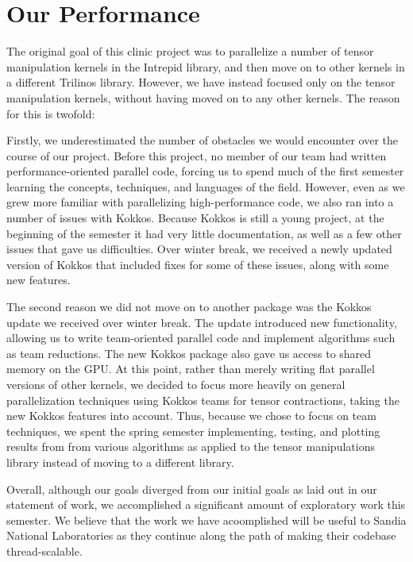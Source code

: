 
\chapter{Our Performance}

The original goal of this clinic project was to parallelize a number of tensor
manipulation kernels in the Intrepid library, and then move on to other kernels
in a different Trilinos library.  However, we have instead focused only on the
tensor manipulation kernels, without having moved on to any other kernels. The
reason for this is twofold:

Firstly, we underestimated the number of obstacles we would encounter over the
course of our project.  Before this project, no member of our team had written
performance-oriented parallel code, forcing us to spend much of the first
semester learning the concepts, techniques, and languages of the field.
However, even as we grew more familiar with parallelizing high-performance code,
we also ran into a number of issues with Kokkos.  Because Kokkos is still a
young project, at the beginning of the semester it had very little
documentation, as well as a few other issues that gave us difficulties.  Over
winter break, we received a newly updated version of Kokkos that included fixes
for some of these issues, along with some new features.

The second reason we did not move on to another package was the Kokkos update we
received over winter break.  The update introduced new functionality, allowing
us to write team-oriented parallel code and implement algorithms such as team
reductions.  The new Kokkos package also gave us access to shared memory on the
GPU. At this point, rather than merely writing flat parallel versions of other
kernels, we decided to focus more heavily on general parallelization techniques
using Kokkos teams for tensor contractions, taking the new Kokkos features into
account.  Thus, because we chose to focus on team techniques, we spent the
spring semester implementing, testing, and plotting results from from various
algorithms as applied to the tensor manipulations library instead of moving to a
different library.

Overall, although our goals diverged from our initial goals as laid out in our 
statement of work, we accomplished a significant amount of exploratory work this
semester. We believe that the work we have acoomplished will be useful to Sandia 
National Laboratories as they continue along the path of making their codebase
thread-scalable.